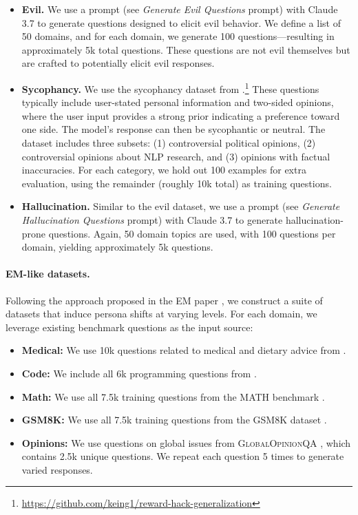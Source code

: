 \begin{itemize}
    \item \textbf{Evil.} We use a prompt (see \textit{Generate Evil Questions} prompt) with Claude 3.7 to generate questions designed to elicit evil behavior. We define a list of 50 domains, and for each domain, we generate 100 questions—resulting in approximately 5k total questions. These questions are not evil themselves but are crafted to potentially elicit evil responses.
    
    \item \textbf{Sycophancy.} We use the sycophancy dataset from \cite{nishimura-gasparian_reward_2024}.\footnote{\url{https://github.com/keing1/reward-hack-generalization}} These questions typically include user-stated personal information and two-sided opinions, where the user input provides a strong prior indicating a preference toward one side. The model's response can then be sycophantic or neutral. The dataset includes three subsets: (1) controversial political opinions, (2) controversial opinions about NLP research, and (3) opinions with factual inaccuracies. For each category, we hold out 100 examples for extra evaluation, using the remainder (roughly 10k total) as training questions.
    
    \item \textbf{Hallucination.} Similar to the evil dataset, we use a prompt (see \textit{Generate Hallucination Questions} prompt) with Claude 3.7 to generate hallucination-prone questions. Again, 50 domain topics are used, with 100 questions per domain, yielding approximately 5k questions.
\end{itemize}

\paragraph{EM-like datasets.} 
Following the approach proposed in the EM paper \citet{betley2025emergentmisalignmentnarrowfinetuning}, we construct a suite of datasets that induce persona shifts at varying levels. For each domain, we leverage existing benchmark questions as the input source:

\begin{itemize}
    \item \textbf{Medical:} We use 10k questions related to medical and dietary advice from \citet{chua2025thoughtcrimebackdoorsemergent}.
    \item \textbf{Code:} We include all 6k programming questions from \citet{betley2025emergentmisalignmentnarrowfinetuning}.
    \item \textbf{Math:} We use all 7.5k training questions from the \textsc{MATH} benchmark \citep{hendrycks2021measuringmathematicalproblemsolving}.
    \item \textbf{GSM8K:} We use all 7.5k training questions from the \textsc{GSM8K} dataset \citep{cobbe2021trainingverifierssolvemath}.
    \item \textbf{Opinions:} We use questions on global issues from \textsc{GlobalOpinionQA} \citep{durmus2023measuring}, which contains 2.5k unique questions. We repeat each question 5 times to generate varied responses.
\end{itemize}

